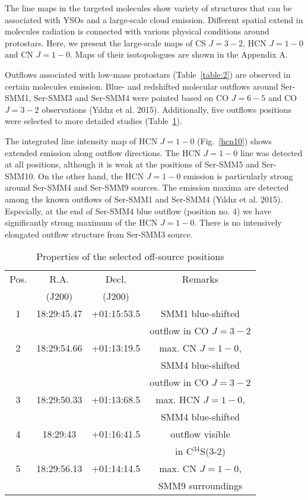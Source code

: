 \documentclass{aa}
\begin{document}
The line maps in the targeted molecules show variety of structures that can be associated with YSOs and a large-scale cloud emission. Different spatial extend in molecules radiation is connected with various physical conditions around protostars. Here, we present the large-scale maps of CS $J=3-2$, HCN $J=1-0$ and CN $J=1-0$. Maps of their isotopologues are shown in the Appendix A. 

Outflows associated with low-mass protostars (Table~\ref{table:2}) are observed in certain molecules emission. Blue- and redshifted molecular outflows around Ser-SMM1, Ser-SMM3 and Ser-SMM4 were pointed based on CO $J=6-5$ and CO $J=3-2$ observations (Y{\i}ld{\i}z et al. 2015). Additionally, five outflows positions were selected to more detailed studies (Table~\ref{table:3}).  

The integrated line intensity map of HCN $J=1-0$ (Fig.~\ref{hcn10}) shows extended emission along outflow directions. The HCN $J=1-0$ line was detected at all positions, although it is weak at the positions of Ser-SMM5 and Ser-SMM10. On the other hand, the HCN $J=1-0$ emission is particularly strong around Ser-SMM4 and Ser-SMM9 sources. The emission maxima are detected among the known outflows of Ser-SMM1 and Ser-SMM4 (Y{\i}ld{\i}z et al. 2015). Especially, at the end of Ser-SMM4 blue outflow (position no. 4) we have significantly strong maximum of the HCN $J=1-0$. There is no intensively elongated outflow structure from Ser-SMM3 source.

\begin{table}
\caption{Properties of the selected off-source positions}             %
\label{table:3}      %
\centering                          %
\begin{tabular}{c c c c} 
\hline\hline 
Pos. & R.A. & Decl. & Remarks\\
 & (J200) & (J200) & \\
\hline
1 & 18:29:45.47 & +01:15:53.5 & SMM1 blue-shifted \\
 & & & outflow in CO $J=3-2$\\
\hline
2 & 18:29:54.66 & +01:13:19.5 & max. CN $J=1-0$, \\
 & & & SMM4 blue-shifted \\
 & & & outflow in CO $J=3-2$\\
\hline
3 & 18:29:50.33 & +01:13:68.5 & max. HCN $J=1-0$, \\
 & & & SMM4 blue-shifted \\
\hline
4 & 18:29:43 & +01:16:41.5 & outflow visible \\
 & & &  in C$^{34}$S(3-2)\\
\hline
5 & 18:29:56.13 & +01:14:14.5 & max. CN $J=1-0$, \\
 & & & SMM9 surroundings\\
\hline
\end{tabular}
\end{table}
\end{document}

